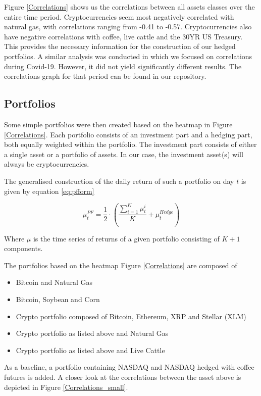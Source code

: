 \documentclass[11pt]{article}
\begin{document}
Figure \ref{Correlations} shows us the correlations between all assets classes over the entire time period. Cryptocurrencies seem most negatively correlated with natural gas, with correlations ranging from -0.41 to -0.57. Cryptocurrencies also have negative correlations with coffee, live cattle and the 30YR US Treasury. This provides the necessary information for the construction of our hedged portfolios. A similar analysis was conducted in which we focused on correlations during Covid-19. However, it did not yield significantly different results. The correlations graph for that period can be found in our repository.

\subsection{Portfolios} \label{sec:portfolios}
Some simple portfolios were then created based on the heatmap in Figure \ref{Correlations}. Each portfolio consists of an investment part and a hedging part, both equally weighted within the portfolio. The investment part consists of either a single asset or a portfolio of assets. In our case, the investment asset(s) will always be cryptocurrencies.

The generalised construction of the daily return of such a portfolio on day $t$ is given by equation \ref{eq:pfform}

\begin{equation} \label{eq:pfform}
\mu_t^{PF} = \frac{1}{2} \cdot \left( \frac{\sum_{i=1}^K{\mu_{t}^{i}}}{K} + \mu_{t}^{Hedge} \right)
\end{equation}

Where $\mu$ is the time series of returns of a given portfolio consisting of $K+1$ components. 

\noindent The portfolios based on the heatmap Figure \ref{Correlations} are composed of 
\begin{itemize}
  \item Bitcoin and Natural Gas
  \item Bitcoin, Soybean and Corn
  \item Crypto portfolio composed of Bitcoin, Ethereum, XRP and Stellar (XLM)
  \item Crypto portfolio as listed above and Natural Gas
   \item Crypto portfolio as listed above and Live Cattle
\end{itemize}

\noindent As a baseline, a portfolio containing NASDAQ and NASDAQ hedged with coffee futures is added. A closer look at the correlations between the asset above is depicted in Figure \ref{Correlations_small}.
\end{document}
